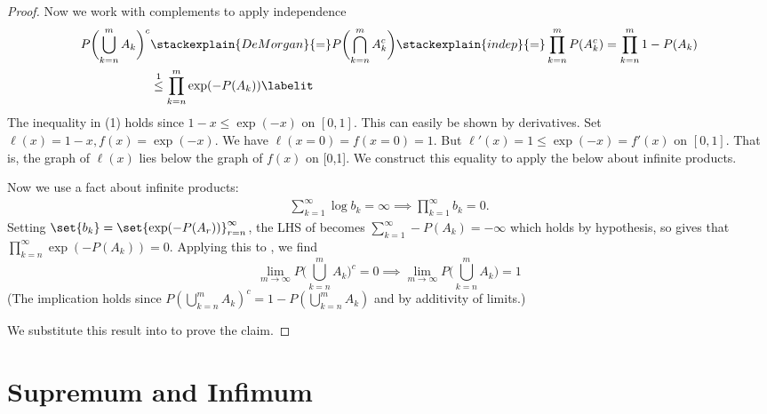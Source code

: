 \documentclass{article} %
\begin{document}
\begin{proof}
Now we work with complements to apply independence 
\begin{align*}
 P\bigg( {\bigcup_{k=n}^{m}  A_k}  \bigg)^c & \stackexplain{De Morgan}{=}  P\bigg( {\bigcap_{k=n}^{m}  A_k^c}  \bigg) \stackexplain{indep}{=} \prod_{k=n}^m P(A_k^c) = \prod_{k=n}^m 1 - P(A_k) \\
 & \stackrel{1}{\leq} \prod_{k=n}^m \exp(-P(A_k)) 
 \labelit \label{eqn:intermediate_equation_for_second_borel_cantelli_lemma}	
\end{align*}
%
{\scriptsize The inequality in (1) holds since $1-x \leq \exp(-x)$ on $[0,1]$.  This can easily be shown by derivatives. Set $\ell(x)=1-x, f(x) =\exp(-x)$. We have $\ell(x=0)=f(x=0)=1$. But $\ell'(x) = 1 \leq \exp(-x) = f'(x)$ on $[0,1]$. That is, the graph of $\ell(x)$ lies below the graph of $f(x)$ on [0,1]. We construct this equality to apply the below about infinite products.}

Now we use a fact about infinite products:
\begin{align}
\sum_{k=1}^\infty \log b_k = \infty \implies \prod_{k=1}^\infty b_k = 0.
\label{eqn:fact_about_infinite_products}
\end{align}
Setting $\set{b_k} = \set{\exp(-P(A_r))}_{r=n}^\infty$, the LHS of   becomes $\sum_{k=1}^\infty -P(A_k) = -\infty$ which holds by hypothesis, so  gives that $\prod_{k=n}^\infty \exp(-P(A_k))=0$.  Applying this to , we find 
\[ \lim_{m \to \infty} P\bigg( {\bigcup_{k=n}^{m}  A_k}  \bigg)^c  =  0 \implies \lim_{m \to \infty} P\bigg( {\bigcup_{k=n}^{m}  A_k}\bigg)  =  1\]
{\scriptsize (The implication holds since $P( {\bigcup_{k=n}^{m}  A_k})^c = 1-P( {\bigcup_{k=n}^{m}  A_k})$ and by additivity of limits.)}

We substitute this result into  to prove the claim.
\end{proof}





 
\newpage 
\appendix

\section{Supremum and Infimum}
\end{document}
